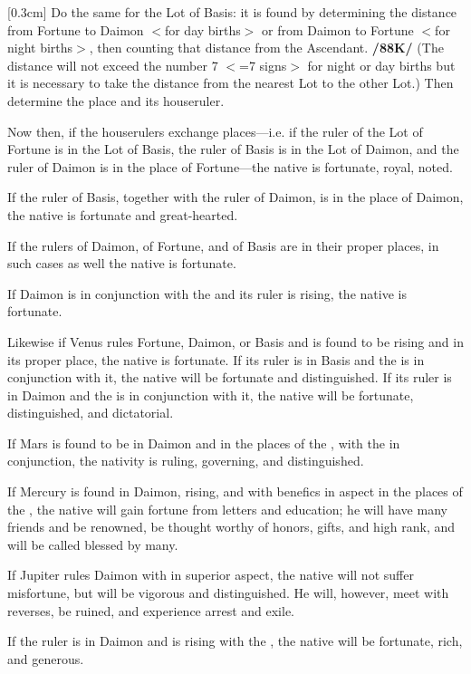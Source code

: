 [0.3cm]
Do the same for the Lot of Basis: it is found by determining the distance from Fortune to Daimon $<$for day births$>$ or from Daimon to Fortune $<$for night births$>$, then counting that distance from the Ascendant. \textbf{/88K/} (The distance will not exceed the number 7 $<$=7 signs$>$ for night or day births but it is necessary to take the distance from the nearest Lot to the other Lot.) Then determine the place and its houseruler.

Now then, if the houserulers exchange places—i.e. if the ruler of the Lot of Fortune is in the Lot of Basis, the ruler of Basis is in the Lot of Daimon, and the ruler of Daimon is in the place of Fortune—the native is fortunate, royal, noted. 

If the ruler of Basis, together with the ruler of Daimon, is in the place of Daimon, the native is fortunate and great-hearted. 

If the rulers of Daimon, of Fortune, and of Basis are in
their proper places, in such cases as well the native is fortunate. 

If Daimon  is in conjunction with the \Sun\xspace and its ruler is rising, the native is fortunate. 

Likewise if Venus rules Fortune, Daimon, or Basis and is found to be rising and in its proper place, the native is fortunate. If its ruler is in Basis and the \Moon\xspace is in conjunction with it, the native will be fortunate and distinguished. If its ruler is in Daimon and the \Sun\xspace is in conjunction with it, the native will be fortunate, distinguished, and dictatorial.

If Mars is found to be in Daimon and in the places of the \Moon, with the \Moon\xspace in conjunction, the nativity is ruling, governing, and distinguished. 

If Mercury is found in Daimon, rising, and with benefics in aspect in the places of the \Moon, the native will gain fortune from letters and education; he will have
many friends and be renowned, be thought worthy of honors, gifts, and high rank, and will be called blessed by many. 

If Jupiter rules Daimon with \Mars\xspace in superior aspect, the native will not suffer misfortune, but will be vigorous and distinguished. He will, however, meet with reverses, be ruined, and experience arrest and exile. 

If the ruler is in Daimon and is rising with the \Moon, the native will be fortunate, rich, and generous. 


